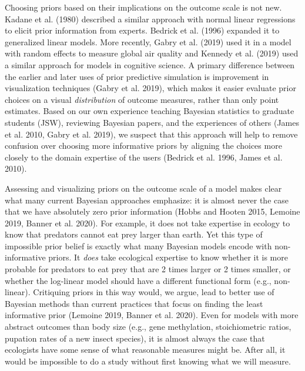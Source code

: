 \documentclass[
  12pt,
]{article}
\begin{document}
Choosing priors based on their implications on the outcome scale is not
new. Kadane et al. (1980) described a similar approach with normal
linear regressions to elicit prior information from experts. Bedrick et
al. (1996) expanded it to generalized linear models. More recently,
Gabry et al. (2019) used it in a model with random effects to measure
global air quality and Kennedy et al. (2019) used a similar approach for
models in cognitive science. A primary difference between the earlier
and later uses of prior predictive simulation is improvement in
visualization techniques (Gabry et al. 2019), which makes it easier
evaluate prior choices on a visual \emph{distribution} of outcome
measures, rather than only point estimates. Based on our own experience
teaching Bayesian statistics to graduate students (JSW), reviewing
Bayesian papers, and the experiences of others (James et al. 2010, Gabry
et al. 2019), we suspect that this approach will help to remove
confusion over choosing more informative priors by aligning the choices
more closely to the domain expertise of the users (Bedrick et al. 1996,
James et al. 2010).

Assessing and visualizing priors on the outcome scale of a model makes
clear what many current Bayesian approaches emphasize: it is almost
never the case that we have absolutely zero prior information (Hobbs and
Hooten 2015, Lemoine 2019, Banner et al. 2020). For example, it does not
take expertise in ecology to know that predators cannot eat prey larger
than earth. Yet this type of impossible prior belief is exactly what
many Bayesian models encode with non-informative priors. It \emph{does}
take ecological expertise to know whether it is more probable for
predators to eat prey that are 2 times larger or 2 times smaller, or
whether the log-linear model should have a different functional form
(e.g., non-linear). Critiquing priors in this way would, we argue, lead
to better use of Bayesian methods than current practices that focus on
finding the least informative prior (Lemoine 2019, Banner et al. 2020).
Even for models with more abstract outcomes than body size (e.g., gene
methylation, stoichiometric ratios, pupation rates of a new insect
species), it is almost always the case that ecologists have some sense
of what reasonable measures might be. After all, it would be impossible
to do a study without first knowing what we will measure.
\end{document}

